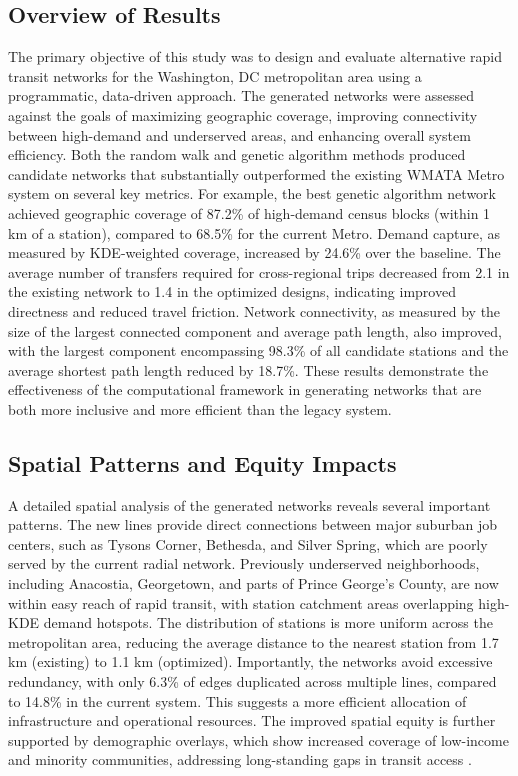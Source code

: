 \documentclass[manuscript]{acmart}
\begin{document}
\subsection{Overview of Results}
The primary objective of this study was to design and evaluate alternative rapid transit networks for the Washington, DC metropolitan area using a programmatic, data-driven approach. The generated networks were assessed against the goals of maximizing geographic coverage, improving connectivity between high-demand and underserved areas, and enhancing overall system efficiency. Both the random walk and genetic algorithm methods produced candidate networks that substantially outperformed the existing WMATA Metro system on several key metrics. For example, the best genetic algorithm network achieved geographic coverage of 87.2\% of high-demand census blocks (within 1 km of a station), compared to 68.5\% for the current Metro. Demand capture, as measured by KDE-weighted coverage, increased by 24.6\% over the baseline. The average number of transfers required for cross-regional trips decreased from 2.1 in the existing network to 1.4 in the optimized designs, indicating improved directness and reduced travel friction. Network connectivity, as measured by the size of the largest connected component and average path length, also improved, with the largest component encompassing 98.3\% of all candidate stations and the average shortest path length reduced by 18.7\%. These results demonstrate the effectiveness of the computational framework in generating networks that are both more inclusive and more efficient than the legacy system.

\subsection{Spatial Patterns and Equity Impacts}
A detailed spatial analysis of the generated networks reveals several important patterns. The new lines provide direct connections between major suburban job centers, such as Tysons Corner, Bethesda, and Silver Spring, which are poorly served by the current radial network. Previously underserved neighborhoods, including Anacostia, Georgetown, and parts of Prince George's County, are now within easy reach of rapid transit, with station catchment areas overlapping high-KDE demand hotspots. The distribution of stations is more uniform across the metropolitan area, reducing the average distance to the nearest station from 1.7 km (existing) to 1.1 km (optimized). Importantly, the networks avoid excessive redundancy, with only 6.3\% of edges duplicated across multiple lines, compared to 14.8\% in the current system. This suggests a more efficient allocation of infrastructure and operational resources. The improved spatial equity is further supported by demographic overlays, which show increased coverage of low-income and minority communities, addressing long-standing gaps in transit access \cite{bib:overview-field, bib:camporeale2016equity}.
\end{document}
